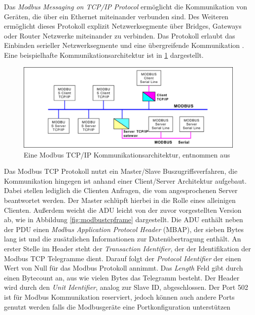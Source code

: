 Das \textit{Modbus Messaging on TCP/IP Protocol} ermöglicht die Kommunikation von Geräten, die über ein Ethernet miteinander verbunden sind. Des Weiteren ermöglicht dieses Protokoll explizit Netzwerksegmente über Bridges, Gateways oder Router Netzwerke miteinander zu verbinden. Das Protokoll erlaubt das Einbinden serieller Netzwerksegmente und eine übergreifende Kommunikation \cite[S.~2f.]{mod06tcp}. Eine beispielhafte Kommunikationsarchitektur ist in \ref{fig:tcparchiktektur} dargestellt. 

\begin{figure}
\centering
\includegraphics[width=\textwidth]{abbildungen/20160322_tcparchitektur}
\caption[Eine Modbus TCP/IP Kommunikationsarchitektur]{Eine Modbus TCP/IP Kommunikationsarchitektur, entnommen aus \cite[S.~4]{mod06tcp}}
\label{fig:tcparchiktektur}
\end{figure}

Das Modbus TCP Protokoll nutzt ein Master/Slave Buszugriffsverfahren, die Kommunikation hingegen ist anhand einer Client/Server Architektur aufgebaut. Dabei stellen lediglich die Clienten Anfragen, die vom angesprochenen Server beantwortet werden. Der Master schlüpft hierbei in die Rolle eines alleinigen Clienten.
Außerdem weicht die ADU leicht von der zuvor vorgestellten Version ab, wie in Abbildung \ref{fig:modbustcpframe} dargestellt. Die ADU enthält neben der PDU einen  \textit{Modbus Application Protocol Header} (MBAP), der sieben Bytes lang ist und die zusätzlichen Informationen zur Datenübertragung enthält. 
An erster Stelle im Header steht der \textit{Transaction Identifier}, der der Identifikation der Modbus TCP Telegramme dient. Darauf folgt der \textit{Protocol Identifier} der einen Wert von Null für das Modbus Protokoll annimmt. Das \textit{Length} Feld gibt durch einen Bytecount an, aus wie vielen Bytes das Telegramm besteht. Der Header wird durch den \textit{Unit Identifier}, analog zur Slave ID, abgeschlossen. Der Port 502 ist für Modbus Kommunikation reserviert, jedoch können auch andere Ports genutzt werden falls die Modbusgeräte eine Portkonfiguration unterstützen \cite[S.~4f.]{mod06tcp}

